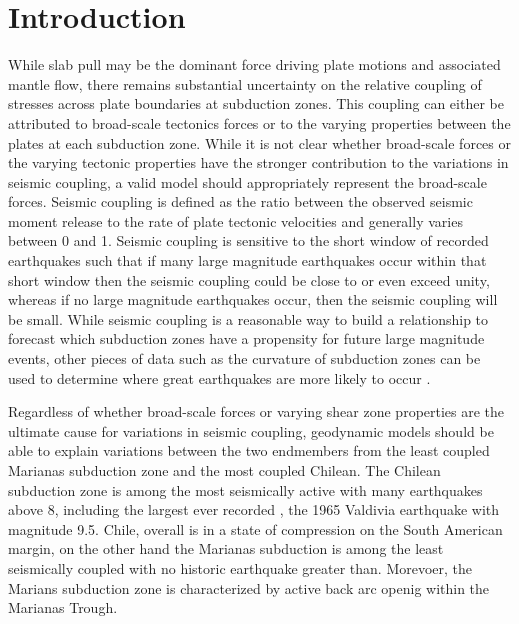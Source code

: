 \documentclass[12pt]{article}
\begin{document}
\section*{Introduction}
While slab pull may be the dominant force driving plate motions and associated mantle flow, there remains substantial uncertainty on the relative coupling of stresses across plate boundaries at subduction zones. This coupling can either be attributed to broad-scale tectonics forces or to the varying properties between the plates at each subduction zone. While it is not clear whether broad-scale forces or the varying tectonic properties have the stronger contribution to the variations in seismic coupling, a valid model should appropriately represent the broad-scale forces. 
Seismic coupling is defined as the ratio between the observed seismic moment release to the rate of plate tectonic velocities and generally varies between 0 and 1. Seismic coupling is sensitive to the short window of recorded earthquakes such that if many large magnitude earthquakes occur within that short window then the seismic coupling could be close to or even exceed unity, whereas if no large magnitude earthquakes occur, then the seismic coupling will be small.  While seismic coupling is a reasonable way to build a relationship to forecast which subduction zones have a propensity for future large magnitude events, other pieces of data such as the curvature of subduction zones can be used to determine where great earthquakes are more likely to occur \citep{bletery2016mega}. 


Regardless of whether broad-scale forces or varying shear zone properties are the ultimate cause for variations in seismic coupling, geodynamic models should be able to explain variations between the two endmembers from the least coupled Marianas subduction zone and the most coupled Chilean. The Chilean subduction zone is among the most seismically active with many earthquakes above 8, including the largest ever recorded , the 1965 Valdivia earthquake with magnitude 9.5. Chile, overall is in a state of compression on the South American margin, on the other hand the Marianas subduction is among the least seismically coupled with no historic earthquake greater than. Morevoer, the Marians subduction zone is characterized by active back arc openig within the Marianas Trough.
\end{document}
